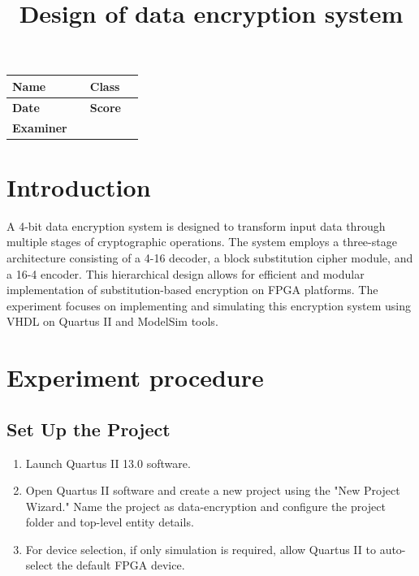 \documentclass[]{article}
\begin{document}
\title{\huge Design of data encryption system}
\author{\large }
\date{}

\maketitle

\vspace{3cm}

\begin{center}
    {\large
        \begin{tabular}{|p{2.5cm}|p{3.5cm}|p{2.5cm}|p{3.5cm}|}
            \hline
            \textbf{Name}     &  & \textbf{Class} &       \\[0.8cm]
            \hline
            \textbf{Date}     &  & \textbf{Score} & \quad \\[0.8cm]
            \hline
            \textbf{Examiner} &  & \quad          & \quad \\[0.8cm]
            \hline
        \end{tabular}
    }
\end{center}

\newpage
\tableofcontents
\newpage

\section{Introduction}
A 4-bit data encryption system is designed to transform input data through multiple stages of cryptographic operations. The system employs a three-stage architecture consisting of a 4-16 decoder, a block substitution cipher module, and a 16-4 encoder. This hierarchical design allows for efficient and modular implementation of substitution-based encryption on FPGA platforms. The experiment focuses on implementing and simulating this encryption system using VHDL on Quartus II and ModelSim tools.

\section{Experiment procedure}
\subsection{Set Up the Project}

\begin{enumerate}[label = (\arabic*)]
    \item Launch Quartus II 13.0 software.
    \item Open Quartus II software and create a new project using the "New Project Wizard." Name the project as data-encryption and configure the project folder and top-level entity details.
    \item For device selection, if only simulation is required, allow Quartus II to auto-select the default FPGA device.

\end{enumerate}
\end{document}
